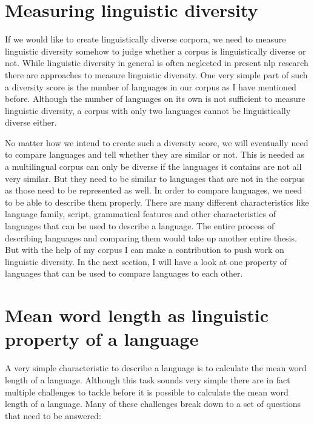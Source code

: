 \section{Measuring linguistic diversity}
\label{sec:measure-ling-div}
If we would like to create linguistically diverse corpora, we need to measure linguistic diversity somehow to judge whether a corpus is linguistically diverse or not. While linguistic diversity in general is often neglected in present \ac{nlp} research there are approaches to measure linguistic diversity. One very simple part of such a diversity score is the number of languages in our corpus as I have mentioned before. Although the number of languages on its own is not sufficient to measure linguistic diversity, a corpus with only two languages cannot be linguistically diverse either. 

No matter how we intend to create such a diversity score, we will eventually need to compare languages and tell whether they are similar or not. This is needed as a multilingual corpus can only be diverse if the languages it contains are not all very similar. But they need to be similar to languages that are not in the corpus as those need to be represented as well. In order to compare languages, we need to be able to describe them properly. There are many different characteristics like language family, script, grammatical features and other characteristics of languages that can be used to describe a language. The entire process of describing languages and comparing them would take up another entire thesis. But with the help of my corpus I can make a contribution to push work on linguistic diversity. In the next section, I will have a look at one property of languages that can be used to compare languages to each other. 

\section{Mean word length as linguistic property of a language}
A very simple characteristic to describe a language is to calculate the mean word length of a language. Although this task sounds very simple there are in fact multiple challenges to tackle before it is possible to calculate the mean word length of a language. Many of these challenges break down to a set of questions that need to be answered:

